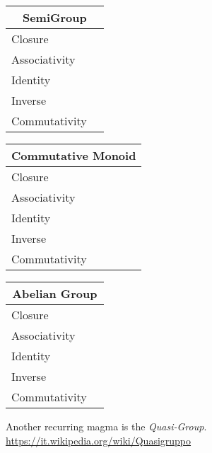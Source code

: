 \documentclass[a4paper,12pt]{scrartcl}    %
\begin{document}
\begin{minipage}[c]{0,5\textwidth}

\begin{tabular}{|l|p{2cm}|} %
  \hline
  \multicolumn{2}{c}{\cellcolor{yellow!25}SemiGroup} \\
  \hline
   \cellcolor{blue!25} Closure&  \\
    \cellcolor{blue!25} Associativity&  \\
    \cellcolor{red!25} Identity&  \\
    \cellcolor{red!25} Inverse&  \\
    \cellcolor{red!25} Commutativity&  \\
  \hline
\end{tabular}

\vspace{0.6cm}
\begin{tabular}{|l|p{2cm}|} %
  \hline
  \multicolumn{2}{c}{\cellcolor{yellow!25}Commutative Monoid} \\
  \hline
   \cellcolor{blue!25} Closure&  \\
    \cellcolor{blue!25} Associativity&  \\
    \cellcolor{blue!25} Identity&  \\
    \cellcolor{red!25} Inverse&  \\
    \cellcolor{blue!25} Commutativity&  \\
  \hline
\end{tabular}

\vspace{0.6cm}
\begin{tabular}{|l|p{2cm}|} %
  \hline
  \multicolumn{2}{c}{\cellcolor{yellow!25}Abelian Group} \\
  \hline
   \cellcolor{blue!25} Closure&  \\
    \cellcolor{blue!25} Associativity&  \\
    \cellcolor{blue!25} Identity&  \\
    \cellcolor{blue!25} Inverse&  \\
    \cellcolor{blue!25} Commutativity&  \\
  \hline
\end{tabular}

\end{minipage}

\begin{observation}
	Another recurring magma is the \emph{Quasi-Group}.
	\url{https://it.wikipedia.org/wiki/Quasigruppo}
\end{observation}
\end{document}
